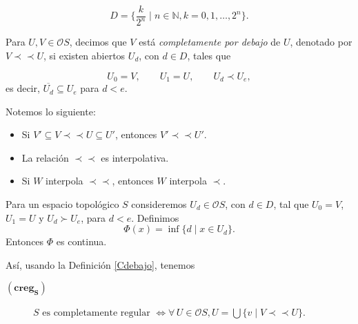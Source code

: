 \documentclass{comunicaciones}
\begin{document}
\[
D=\{\frac{k}{2^n}\mid n\in \mathbb{N}, k=0, 1, \dots , 2^n\}.
\]


\begin{dfn}\label{Cdebajo}
    Para $U,V\in \mathcal{O}S$, decimos que $V$ está \emph{completamente por debajo} de $U$, denotado por $V\prec\prec U$, si existen abiertos $U_d$, con $d\in D$, tales que 

    \[
    U_0=V, \qquad U_1=U, \qquad U_d\prec U_e,
    \]
    es decir, $\overline{U_d}\subseteq U_e$ para $d<e$.
\end{dfn}

Notemos lo siguiente:

\begin{itemize}
    \item Si $V'\subseteq V\prec \prec U\subseteq U'$, entonces $V'\prec \prec U'$.
    \item La relación $\prec\prec$ es interpolativa.
    \item Si $W$ interpola $\prec\prec$, entonces $W$ interpola $\prec$.
\end{itemize}

\begin{prop}\label{Fcontinua}
    Para un espacio topológico $S$ consideremos $U_d\in \mathcal{O}S$, con $d\in D$, tal que $U_0=V$, $U_1=U$ y $U_d\succ U_e$, para $d<e$. Definimos 
    \[
    \Phi(x)=\inf\{d\mid x\in U_d\}.
    \]
    Entonces $\Phi$ es continua.
\end{prop}

Así, usando la Definición \ref{Cdebajo}, tenemos 

\begin{description}
\item[$(\mathbf{creg_S})$] $S \mbox{ es completamente regular }\Leftrightarrow \forall\, U\in \mathcal{O}S, U=\bigcup\{v\mid V\prec \prec U\}$.
\end{description}
\end{document}
